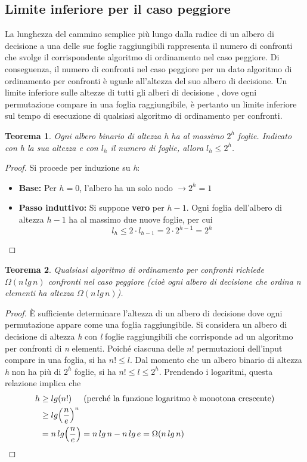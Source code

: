 \documentclass[10pt, a4paper]{report}
\newtheorem{theorem}{Teorema}[chapter]
\newcommand\firsttab[1][0.5cm]{\hspace*{#1}}
\begin{document}
\subsection{Limite inferiore per il caso peggiore}
La lunghezza del cammino semplice più lungo dalla radice di un albero di decisione a una delle sue foglie raggiungibili rappresenta il numero di confronti che svolge il corrispondente algoritmo di ordinamento nel caso peggiore. Di conseguenza, il numero di confronti nel caso peggiore per un dato algoritmo di ordinamento per confronti è uguale all'altezza del suo albero di decisione. Un limite inferiore sulle altezze di tutti gli alberi di decisione , dove ogni permutazione compare in una foglia raggiungibile, è pertanto un limite inferiore sul tempo di esecuzione di qualsiasi algoritmo di ordinamento per confronti.
\begin{theorem}
Ogni albero binario di altezza \textit{h} ha al massimo $2^h$ foglie. Indicato con \textit{h} la sua altezza e con $l_h$ il numero di foglie, allora $l_h \leq 2^h$.
\end{theorem}
\begin{proof}
Si procede per induzione su \textit{h}:
\begin{itemize}
\item\textbf{Base:} Per $h = 0$, l'albero ha un solo nodo $\rightarrow 2^h = 1$
\item\textbf{Passo induttivo:} Si suppone \textbf{vero} per $h - 1$. Ogni foglia dell'albero di altezza $h - 1$ ha al massimo due nuove foglie, per cui
\begin{equation*}
l_h \leq 2\cdot l_{h-1} = 2\cdot 2^{h-1} = 2^h
\end{equation*}
\end{itemize}
\end{proof}
\begin{theorem}
Qualsiasi algoritmo di ordinamento per confronti richiede $\Omega(n\,lg\,n)$ confronti nel caso peggiore (cioè ogni albero di decisione che ordina \textit{n} elementi ha altezza $\Omega(n\,lg\,n)$).
\end{theorem}
\begin{proof}
È sufficiente determinare l'altezza di un albero di decisione dove ogni permutazione appare come una foglia raggiungibile. Si considera un albero di decisione di altezza \textit{h} con \textit{l} foglie raggiungibili che corrisponde ad un algoritmo per confronti di \textit{n} elementi. Poiché ciascuna delle $n!$ permutazioni dell'input compare in una foglia, si ha $n! \leq l$. Dal momento che un albero binario di altezza \textit{h} non ha più di $2^h$ foglie, si ha $n! \leq l \leq 2^h$. Prendendo i logaritmi, questa relazione implica che
\begin{align*}
h &\geq lg(n!) \text{\firsttab (perché la funzione logaritmo è monotona crescente)} \\
&\geq lg\Bigl(\frac{n}{e}\Bigr)^n \\
&= n\,lg\Bigl(\frac{n}{e}\Bigr) = n\,lg\,n - n\,lg\,e = \Omega(n\,lg\,n) 
\end{align*}
\end{proof}
\end{document}
